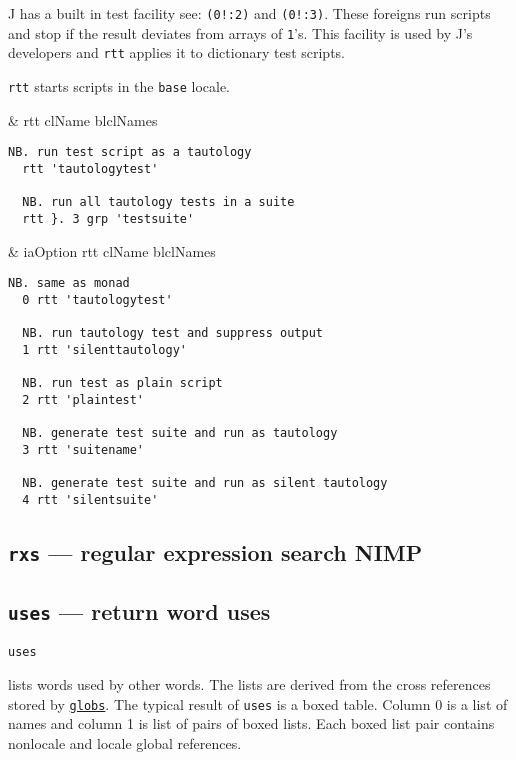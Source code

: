 J has a built in test facility see: \verb|(0!:2)| and \verb|(0!:3)|.  
These foreigns run scripts and stop if the result deviates 
from arrays of \texttt{1}'s.  This facility is used by J's developers 
and \texttt{rtt} applies it to dictionary test scripts.  
  
\texttt{rtt} starts scripts in the \texttt{base} locale. 

\begin{wordhead}
\monad & rtt clName \argsep blclNames \\
\end{wordhead}
\begin{lstlisting}[frame=single,framerule=0pt] 
  NB. run test script as a tautology
  rtt 'tautologytest'    
  
  NB. run all tautology tests in a suite 
  rtt }. 3 grp 'testsuite'  
\end{lstlisting}  

\begin{wordhead}
\dyad & iaOption rtt clName \argsep blclNames \\
\end{wordhead}
\begin{lstlisting}[frame=single,framerule=0pt] 
  NB. same as monad
  0 rtt 'tautologytest'    
  
  NB. run tautology test and suppress output 
  1 rtt 'silenttautology'  
  
  NB. run test as plain script
  2 rtt 'plaintest'        
  
  NB. generate test suite and run as tautology 
  3 rtt 'suitename'  
   
  NB. generate test suite and run as silent tautology      
  4 rtt 'silentsuite'      
\end{lstlisting}   

\subsection{\texttt{rxs} --- regular expression search NIMP}\label{ss:rxs}               

\subsection{\texttt{uses} --- return word uses} 

\hypertarget{il:uses}{\texttt{uses}} lists words used by other words. The lists 
are derived from the cross references stored 
by \hyperlink{il:globs}{\texttt{globs}}. The typical result
 of \texttt{uses} is a boxed table. Column 0 is a list of names and column 1 is list 
 of pairs of boxed lists. Each boxed list pair contains nonlocale 
 and locale global references. 

